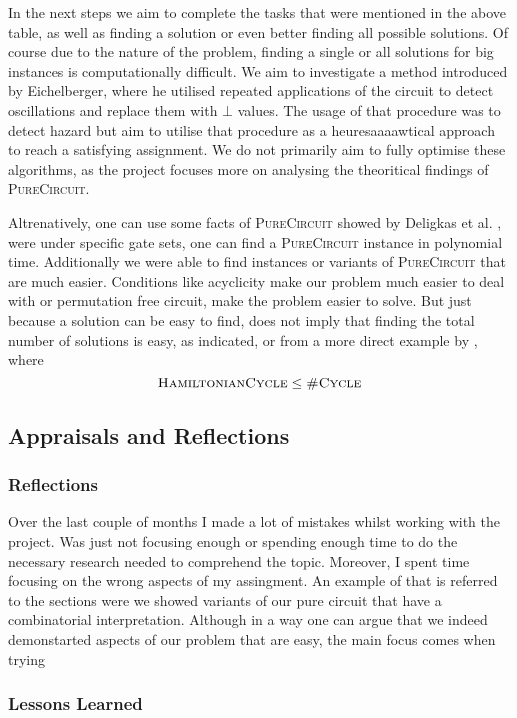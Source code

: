 In the next steps we aim to complete the tasks that were mentioned in the above table,
as well as finding a solution or even better finding all possible solutions. Of
course due to the nature of the problem, finding a single or all solutions for big instances
is computationally difficult. We aim to investigate a method introduced by Eichelberger, where
he utilised repeated applications of the circuit to detect oscillations and replace them with
$\bot$ values. The usage of that procedure was to detect hazard but aim to utilise that procedure
as a heuresaaaawtical approach to reach a satisfying assignment. We do not primarily aim
to fully optimise these algorithms, as the project focuses more on analysing the theoritical findings
of \textsc{PureCircuit}.



Altrenatively, one can use some facts of \textsc{PureCircuit} showed by Deligkas et al.
\cite{deligkasPureCircuitTightInapproximability2024}, were under specific 
gate sets, one can find a \textsc{PureCircuit} instance in polynomial time.
Additionally we were able to find instances or variants of \textsc{PureCircuit}
that are much easier. Conditions like acyclicity make our problem much easier to deal with
or permutation free circuit, make the problem easier to solve.
But just because a solution can be easy to find, does not imply that finding the total number of solutions
is easy, as \cite{valiantComplexityComputingPermanent1979} indicated, or from a more direct
example by \cite{aroraComputationalComplexityModern2009}, where
$$
\textsc{HamiltonianCycle} \leq \textsc{\#Cycle}
$$




\subsection{Appraisals and Reflections}

\subsubsection{Reflections}
Over the last couple of months I made a lot of mistakes whilst working with the project.
Was just not focusing enough or spending enough time to do the necessary research needed
to comprehend the topic. Moreover, I spent time focusing on the wrong aspects of my assingment.
An example of that is referred to the sections were we showed variants of our pure circuit
that have a combinatorial interpretation. Although in a way one can argue that we indeed 
demonstarted aspects of our problem that are easy, the main focus comes when trying 

\subsubsection{Lessons Learned}
